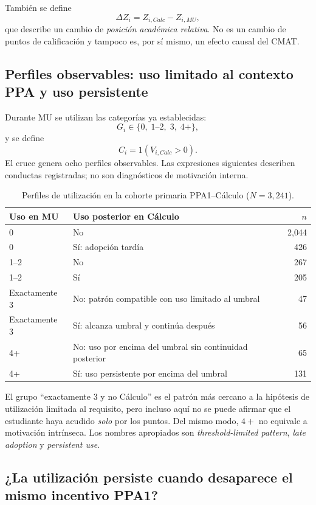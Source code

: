 También se define
\[
\Delta Z_i=Z_{i,Calc}-Z_{i,MU},
\]
que describe un cambio de \emph{posición académica relativa}. No es un cambio de puntos de calificación y tampoco es, por sí mismo, un efecto causal del CMAT.

\subsection{Perfiles observables: uso limitado al contexto PPA y uso persistente}

Durante MU se utilizan las categorías ya establecidas:
\[
G_i\in\{0,\;1\text{--}2,\;3,\;4+\},
\]
y se define
\[
C_i=1(V_{i,Calc}>0).
\]
El cruce genera ocho perfiles observables. Las expresiones siguientes describen conductas registradas; no son diagnósticos de motivación interna.

\begin{table}[H]
\centering
\caption{Perfiles de utilización en la cohorte primaria PPA1--Cálculo ($N=3{,}241$).}
\label{tab:ppa_v8_profiles}
\begin{tabular}{@{}llr@{}}
\toprule
Uso en MU & Uso posterior en Cálculo & $n$ \\
\midrule
0 & No & 2,044 \\
0 & Sí: adopción tardía & 426 \\
1--2 & No & 267 \\
1--2 & Sí & 205 \\
Exactamente 3 & No: patrón compatible con uso limitado al umbral & 47 \\
Exactamente 3 & Sí: alcanza umbral y continúa después & 56 \\
4+ & No: uso por encima del umbral sin continuidad posterior & 65 \\
4+ & Sí: uso persistente por encima del umbral & 131 \\
\bottomrule
\end{tabular}
\end{table}

El grupo ``exactamente 3 y no Cálculo'' es el patrón más cercano a la hipótesis de utilización limitada al requisito, pero incluso aquí no se puede afirmar que el estudiante haya acudido \emph{solo} por los puntos. Del mismo modo, $4+$ no equivale a motivación intrínseca. Los nombres apropiados son \emph{threshold-limited pattern}, \emph{late adoption} y \emph{persistent use}.

\subsection{¿La utilización persiste cuando desaparece el mismo incentivo PPA1?}

